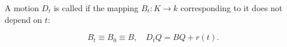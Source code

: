 A motion $D_t$ is called  if the mapping $B_t: K \to k$ corresponding to it does not depend on $t$:

$$B_t \equiv B_0 \equiv B, \quad D_t Q = B Q + r(t).$$
